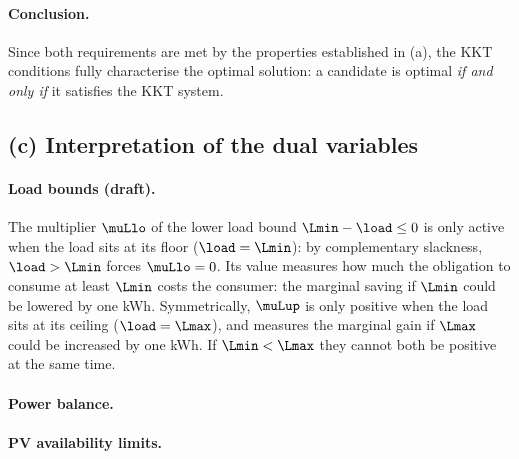 \paragraph{Conclusion.}
Since both requirements are met by the properties established in (a), the KKT conditions
fully characterise the optimal solution: a candidate is optimal \emph{if and only if} it
satisfies the KKT system.

\subsection{(c) Interpretation of the dual variables}

\paragraph{Load bounds (draft).}
The multiplier $\muLlo$ of the lower load bound $\Lmin - \load \leq 0$ is only active when
the load sits at its floor ($\load = \Lmin$): by complementary slackness, $\load > \Lmin$
forces $\muLlo = 0$. Its value measures how much the obligation to consume at least $\Lmin$
costs the consumer: the marginal saving if $\Lmin$ could be lowered by one kWh. Symmetrically,
$\muLup$ is only positive when the load sits at its ceiling ($\load = \Lmax$), and measures the
marginal gain if $\Lmax$ could be increased by one kWh. If $\Lmin < \Lmax$ they cannot both be
positive at the same time.

\paragraph{Power balance.}

\paragraph{PV availability limits.}

